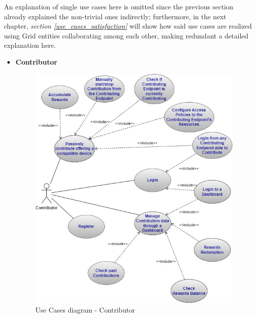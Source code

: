 An explanation of single use cases here is omitted since the previous section already explained the non-trivial ones indirectly; furthermore, in the next chapter, \textit{section \ref{use_cases_satisfaction}} will show how said use cases are realized using Grid entities collaborating among each other, making redundant a detailed explanation here.

\begin{itemize}
\item \textbf{Contributor}
\begin{figure}[!ht]
    \centering
    \includegraphics[scale=0.64]{document/chapters/chapter_4/images/contributor_use_cases.jpg}
    \caption{Use Cases diagram - Contributor}
    \label{fig:use_cases_contributor}
\end{figure}


\end{itemize}
